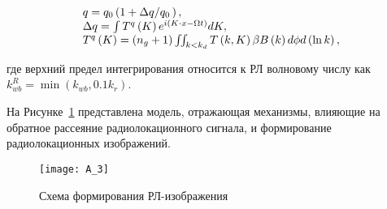 \begin{equation} \label{1.45)} \begin{array}{l} {q=q_{0} \left(1+{\Delta q\mathord{\left/ {\vphantom {\Delta q q_{0} \, }} \right. \kern-\nulldelimiterspace} q_{0} \, } \right),} \\ {\Delta q=\int T^{q} \left(K\right)e^{i\left(K\cdot x-\Omega t\right)}  dK,} \\ {T^{q} \left(K\right)=\left(n_{g} +1\right)\iint \nolimits _{k<k_{d} }T\left(k,K\right)\beta B\left(k\right) d\phi d\left(\ln k\right),} \end{array} \end{equation}



\noindent где верхний предел интегрирования относится к РЛ волновому числу как $k_{wb}^{R} =\min \left(k_{wb} ,0.1k_{r} \right)$.

На Рисунке~\ref{fig:A.3} представлена модель, отражающая механизмы, влияющие на обратное рассеяние радиолокационного сигнала, и формирование радиолокационных изображений.



\begin{figure}[H]
    \texttt{[image: A\_3]}
    \caption{Схема формирования РЛ-изображения}
    \label{fig:A.3}
\end{figure}